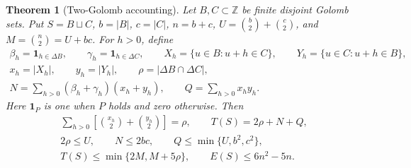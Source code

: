 \documentclass[11pt,a4paper]{article}
\newtheorem{theorem}{Theorem}[section]
\theoremstyle{definition}
\newcommand{\Z}{\mathbb Z}
\newcommand{\ind}{\mathbf1}
\numberwithin{equation}{section}
\begin{document}
\begin{theorem}[Two-Golomb accounting]\label{thm:energy}
Let $B,C\subset\Z$ be finite disjoint Golomb sets. Put
$S=B\sqcup C$, $b=|B|$, $c=|C|$, $n=b+c$,
$U=\binom b2+\binom c2$, and $M=\binom n2=U+bc$.
For $h>0$, define
\[
\begin{gathered}
\beta_h=\ind_{h\in\Delta B},\qquad \gamma_h=\ind_{h\in\Delta C},\qquad
X_h=\{u\in B:u+h\in C\},\qquad Y_h=\{u\in C:u+h\in B\},\\
x_h=|X_h|,\qquad y_h=|Y_h|,\qquad \rho=|\Delta B\cap\Delta C|,\\
N=\sum_{h>0}(\beta_h+\gamma_h)(x_h+y_h),\qquad
Q=\sum_{h>0}x_hy_h.
\end{gathered}
\]
Here $\ind_P$ is one when $P$ holds and zero otherwise. Then
\begin{gather}
\sum_{h>0}\left[\binom{x_h}{2}+\binom{y_h}{2}\right]=\rho,
\qquad T(S)=2\rho+N+Q,\label{eq:collision}\\
2\rho\le U,\qquad N\le2bc,\qquad Q\le\min\{U,b^2,c^2\},\label{eq:resources}\\
T(S)\le\min\{2M,M+5\rho\},\qquad
E(S)\le6n^2-5n.\label{eq:energybound}
\end{gather}
\end{theorem}
\end{document}
